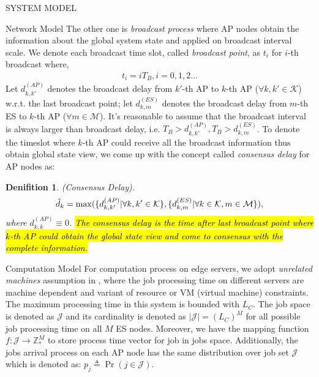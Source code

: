 \documentclass[10pt, conference, letterpaper]{IEEEtran}
\newtheorem{definition}{Denifition}
\newcommand{\domZ}{\mathbb{Z}_{*}}
\newcommand{\define}{\triangleq}
\DeclarePairedDelimiter{\set}{\{}{\}}
\newcommand{\apSet}{\mathcal{K}}
\newcommand{\esSet}{\mathcal{M}}
\newcommand{\jSet}{\mathcal{J}}
\begin{document}
\begin{section}{SYSTEM MODEL}
\begin{subsection}{Network Model}
            The other one is \emph{broadcast process} where AP nodes obtain the information about the global system state and applied on broadcast interval scale. We denote each broadcast time slot, called \emph{broadcast point}, as $t_i$ for $i$-th broadcast where,
            \begin{align}
                t_i = i T_B, i=0,1,2\dots
            \end{align} 
            Let $d^{(AP)}_{k,k'}$ denotes the broadcast delay from $k'$-th AP to $k$-th AP ($\forall k,k'\in\apSet$) w.r.t. the last broadcast point; let $d^{(ES)}_{k,m}$ denotes the broadcast delay from $m$-th ES to $k$-th AP ($\forall m\in\esSet$). It's reasonable to assume that the broadcast interval is always larger than broadcast delay, i.e. $T_B > d^{(AP)}_{k,k'}, T_B > d^{(ES)}_{k,m}$. To denote the timeslot where $k$-th AP could receive all the broadcast information thus obtain global state view, we come up with the concept called \emph{consensus delay} for AP nodes as:
            \begin{definition}
                (Consensus Delay).
                \begin{align}
                    \hat{d}_k = \max(\set{d^{(AP)}_{k,k'}|\forall k,k'\in\apSet}, \set{d^{(ES)}_{k,m}|\forall k\in\apSet,m\in\esSet}),
                \end{align}
                where $d^{(AP)}_{k,k} \equiv 0$. \hl{The consensus delay is the time after last broadcast point where $k$-th AP could obtain the global state view and come to consensus with the complete information.}
            \end{definition}
        \end{subsection}

        \begin{subsection}{Computation Model}
            For computation process on edge servers, we adopt \emph{unrelated machines} assumption in \cite{tan-online}, where the job processing time on different servers are machine dependent and variant of resource or VM (virtual machine) constraints.
            The maximum processing time in this system is bounded with $L_C$.
            The job space is denoted as $\jSet$ and its cardinality is denoted as $|\jSet|=(L_C)^M$ for all possible job processing time on all $M$ ES nodes.
            Moreover, we have the mapping function $f:\jSet \to \domZ^M$ to store process time vector for job in jobs space.
            Additionally, the jobs arrival process on each AP node has the same distribution over job set $\jSet$ which is denoted as: $p_j \define \Pr(j\in\jSet)$.
            

\end{subsection}
\end{section}
\end{document}
